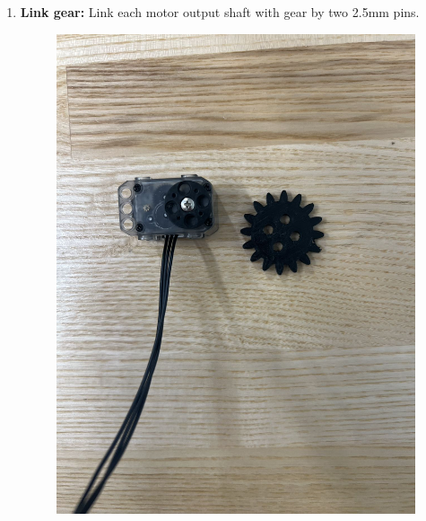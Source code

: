 \documentclass{article}
\begin{document}
\begin{enumerate}[label=Step \arabic*:,leftmargin=*,align=left]
    \item \textbf{Link gear:}
    Link each motor output shaft with gear by two 2.5mm pins.

    \begin{figure}[h]
        \centering
        \begin{minipage}{0.36\textwidth}
            \centering
            \includegraphics[width=\linewidth]{4.jpg} 
            \caption{}
        \end{minipage}
        \hspace{10pt}
        \begin{minipage}{0.36\textwidth}
            \centering

\end{minipage}
\end{figure}
\end{enumerate}
\end{document}
